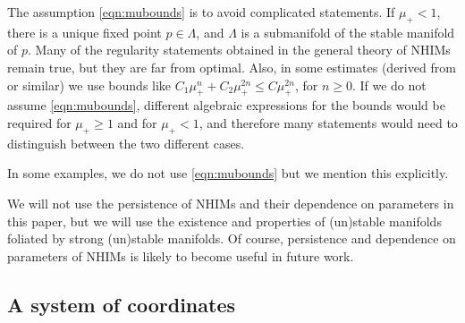 \documentclass[11pt]{amsart}
\theoremstyle{definition}
\theoremstyle{remark}
\newtheorem{rem}[thm]{Remark}
\numberwithin{equation}{section}
\begin{document}
The assumption \eqref{eqn:mubounds}  is to
avoid complicated statements. If $\mu_+ < 1$,
there is a unique fixed point $p \in \Lambda$,  and
$\Lambda$ is a submanifold of the stable manifold of $p$. Many of the regularity statements obtained in the general theory of NHIMs remain true, but they are far from optimal.
Also, in some estimates (derived from \cite[Proposition 15]{DLS08} or similar)
we use bounds like $C_1 \mu_+^n + C_2 \mu_+^{2n}  \le C \mu_+^{2n}$, for $n \ge 0$.
If we do not assume \eqref{eqn:mubounds},
different algebraic expressions for the bounds would be required for $\mu_+\ge 1$ and  for $\mu_+ < 1$, and therefore many statements would need to distinguish between the two different cases.

In some examples, we do not use \eqref{eqn:mubounds} but we mention this
explicitly.



\medskip


We will not use the persistence of NHIMs and their dependence on parameters in this paper,
but we will use the existence and properties of (un)stable manifolds foliated by
strong (un)stable manifolds. Of course, persistence
and dependence on parameters of NHIMs is likely  to  become useful
in future work.

%
%



\subsection{A system of coordinates}
\label{rem:new coordinates}
\end{document}
